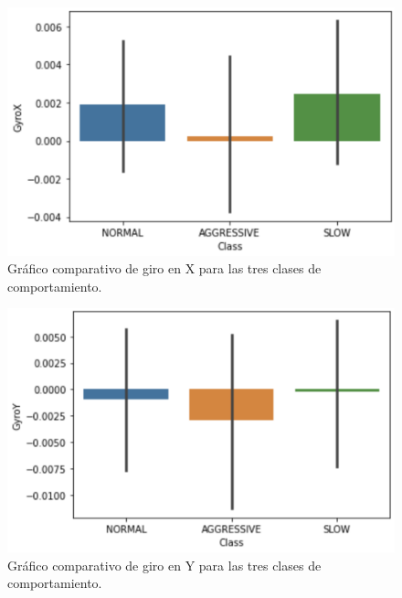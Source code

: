 \documentclass[spanish,12pt,letterpaper]{article}
\begin{document}
    \begin{figure}[H]
        \centering
        \includegraphics[width=1\columnwidth]{GyroX.png}
        \caption{Gráfico comparativo de giro en X para las tres clases de comportamiento.}
        \label{fig:comand}%
    \end{figure}

    \begin{figure}[H]
        \centering
        \includegraphics[width=1\columnwidth]{GyroY.png}
        \caption{Gráfico comparativo de giro en Y para las tres clases de comportamiento.}
        \label{fig:comand}%
    \end{figure}
\end{document}
